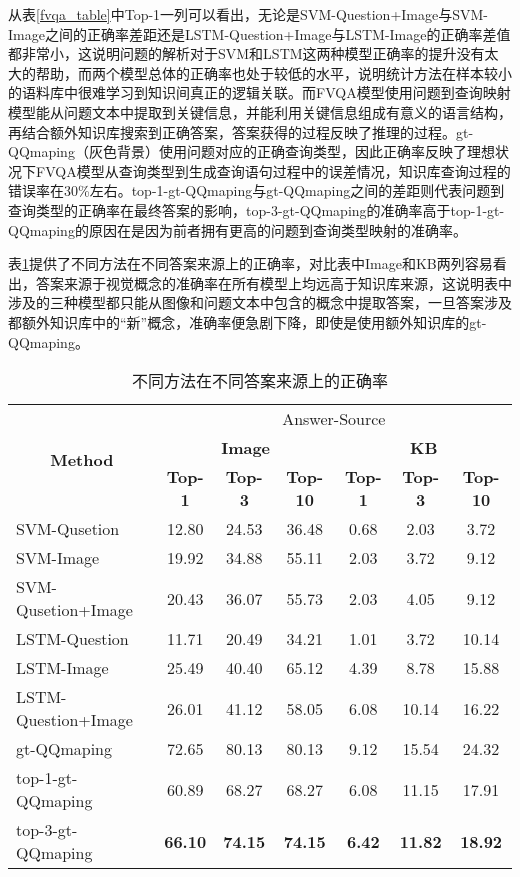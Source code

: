 从表\ref{fvqa_table}中Top-1一列可以看出，无论是SVM-Question+Image与SVM-Image之间的正确率差距还是LSTM-Question+Image与LSTM-Image的正确率差值都非常小，这说明问题的解析对于SVM和LSTM这两种模型正确率的提升没有太大的帮助，而两个模型总体的正确率也处于较低的水平，说明统计方法在样本较小的语料库中很难学习到知识间真正的逻辑关联。而FVQA模型使用问题到查询映射模型能从问题文本中提取到关键信息，并能利用关键信息组成有意义的语言结构，再结合额外知识库搜索到正确答案，答案获得的过程反映了推理的过程。gt-QQmaping（灰色背景）使用问题对应的正确查询类型，因此正确率反映了理想状况下FVQA模型从查询类型到生成查询语句过程中的误差情况，知识库查询过程的错误率在30\%左右。top-1-gt-QQmaping与gt-QQmaping之间的差距则代表问题到查询类型的正确率在最终答案的影响，top-3-gt-QQmaping的准确率高于top-1-gt-QQmaping的原因在是因为前者拥有更高的问题到查询类型映射的准确率。

表\ref{fvqa_answerSource}提供了不同方法在不同答案来源上的正确率，对比表中Image和KB两列容易看出，答案来源于视觉概念的准确率在所有模型上均远高于知识库来源，这说明表中涉及的三种模型都只能从图像和问题文本中包含的概念中提取答案，一旦答案涉及都额外知识库中的“新”概念，准确率便急剧下降，即使是使用额外知识库的gt-QQmaping。
\begin{table}[H]
\centering
\caption{不同方法在不同答案来源上的正确率}
\begin{tabular}{lcccccc}
\toprule
\multicolumn{1}{c}{\multirow{3}{*}{\textbf{Method}}} & \multicolumn{6}{c}{Answer-Source}\\
\cmidrule(r){2-7}
 & \multicolumn{3}{c}{\textbf{Image}} & \multicolumn{3}{c}{\textbf{KB}}\\
\cmidrule(r){2-4}
\cmidrule(r){5-7}
 & \textbf{Top-1} & \textbf{Top-3} & \textbf{Top-10} & \textbf{Top-1} & \textbf{Top-3} & \textbf{Top-10} \\
 \midrule
SVM-Qusetion        & 12.80 & 24.53 & 36.48 & 0.68 & 2.03 & 3.72 \\
SVM-Image           & 19.92 & 34.88 & 55.11 & 2.03 & 3.72 & 9.12 \\
SVM-Qusetion+Image  & 20.43 & 36.07 & 55.73 & 2.03 & 4.05 & 9.12 \\
LSTM-Question       & 11.71 & 20.49 & 34.21 & 1.01 & 3.72 & 10.14 \\
LSTM-Image          & 25.49 & 40.40 & 65.12 & 4.39 & 8.78 & 15.88 \\
LSTM-Question+Image & 26.01 & 41.12 & 58.05 & 6.08 & 10.14 & 16.22 \\
\midrule
\cellcolor[HTML]{C0C0C0}gt-QQmaping & \cellcolor[HTML]{C0C0C0}72.65 & \cellcolor[HTML]{C0C0C0}80.13 & \cellcolor[HTML]{C0C0C0}80.13  & \cellcolor[HTML]{C0C0C0}9.12 & \cellcolor[HTML]{C0C0C0}15.54 & \cellcolor[HTML]{C0C0C0}24.32 \\
top-1-gt-QQmaping & 60.89 & 68.27 & 68.27 & 6.08 & 11.15 & 17.91 \\ 
top-3-gt-QQmaping & \textbf{66.10} & \textbf{74.15} & \textbf{74.15} & \textbf{6.42} & \textbf{11.82} & \textbf{18.92} \\
\bottomrule
\end{tabular}
\label{fvqa_answerSource}
\end{table}

